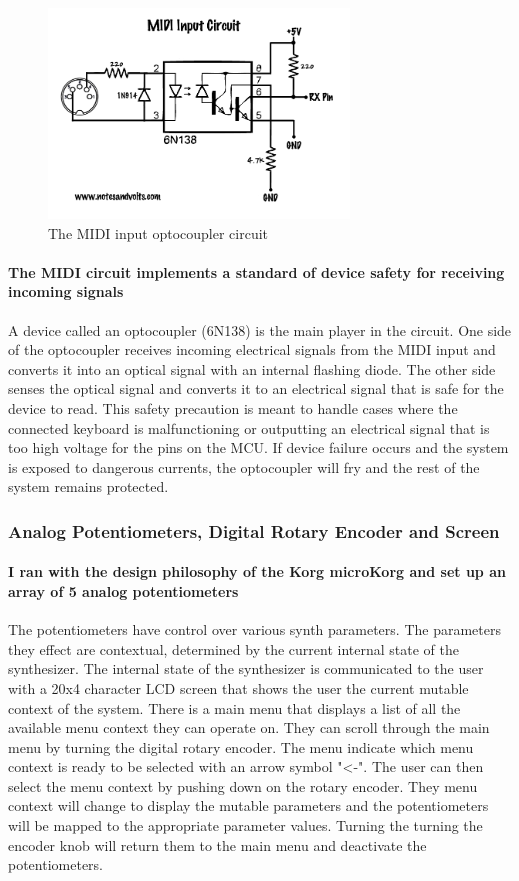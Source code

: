 \documentclass[acmlarge,screen]{acmart}
\begin{document}
	\clearpage
	
	\begin{figure}
		\includegraphics[width=8cm]{midi_optocoupler_circuit}
		\caption{The MIDI input optocoupler circuit}
		\centering
	\end{figure}

	\paragraph{The MIDI circuit implements a standard of device safety for receiving incoming signals} A device called an optocoupler (6N138) is the main player in the circuit. One side of the optocoupler receives incoming electrical signals from the MIDI input and converts it into an optical signal with an internal flashing diode. The other side senses the optical signal and converts it to an electrical signal that is safe for the device to read. This safety precaution is meant to handle cases where the connected keyboard is malfunctioning or outputting an electrical signal that is too high voltage for the pins on the MCU. If device failure occurs and the system is exposed to dangerous currents, the optocoupler will fry and the rest of the system remains protected.

	\subsubsection{Analog Potentiometers, Digital Rotary Encoder and Screen}
	\paragraph{I ran with the design philosophy of the Korg microKorg and set up an array of 5 analog potentiometers} The potentiometers have control over various synth parameters. The parameters they effect are contextual, determined by the current internal state of the synthesizer. The internal state of the synthesizer is communicated to the user with a 20x4 character LCD screen that shows the user the current mutable context of the system. There is a main menu that displays a list of all the available menu context they can operate on. They can scroll through the main menu by turning the digital rotary encoder. The menu indicate which menu context is ready to be selected with an arrow symbol "<-". The user can then select the menu context by pushing down on the rotary encoder. They menu context will change to display the mutable parameters and the potentiometers will be mapped to the appropriate parameter values. Turning the turning the encoder knob will return them to the main menu and deactivate the potentiometers.
\end{document}
